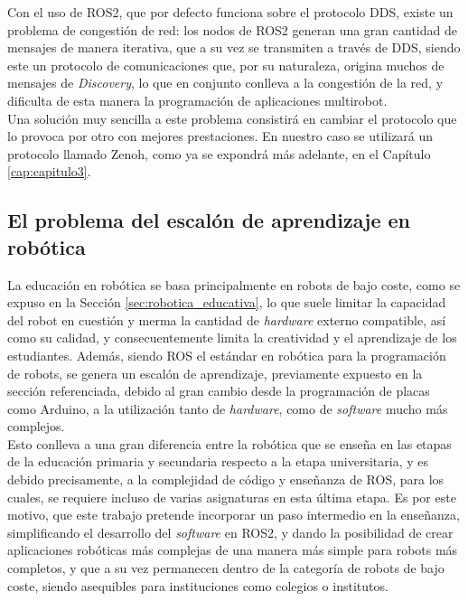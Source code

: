Con el uso de ROS2, que por defecto funciona sobre el protocolo DDS, existe un
problema de congestión de red: los nodos de ROS2 generan una gran cantidad de
mensajes de manera iterativa, que a su vez se transmiten a través de DDS, siendo
este un protocolo de comunicaciones que, por su naturaleza, origina muchos de
mensajes de \textit{Discovery}, lo que en conjunto conlleva a la congestión de
la red, y dificulta de esta manera la programación de aplicaciones multirobot.
\\

Una solución muy sencilla a este problema consistirá en cambiar el protocolo que
lo provoca por otro con mejores prestaciones.
En nuestro caso se utilizará un protocolo llamado Zenoh, como ya se expondrá más
adelante, en el Capítulo \ref{cap:capitulo3}.


\subsection{El problema del escalón de aprendizaje en robótica}
\label{sec:problema_escalon}

La educación en robótica se basa principalmente en robots de bajo coste, como se
expuso en la Sección \ref{sec:robotica_educativa}, lo que suele limitar la
capacidad del robot en cuestión y merma la cantidad de \textit{hardware} externo
compatible, así como su calidad, y consecuentemente limita la creatividad y el
aprendizaje de los estudiantes.
Además, siendo ROS el estándar en robótica para la programación de robots,
se genera un escalón de aprendizaje, previamente expuesto en la sección
referenciada, debido al gran cambio desde la programación de placas como
Arduino, a la utilización tanto de \textit{hardware}, como de \textit{software}
mucho más complejos.
\\

Esto conlleva a una gran diferencia entre la robótica que se enseña en las
etapas de la educación primaria y secundaria respecto a la etapa universitaria,
y es debido precisamente, a la complejidad de código y enseñanza de ROS, para
los cuales, se requiere incluso de varias asignaturas en esta última etapa.
Es por este motivo, que este trabajo pretende incorporar un paso intermedio en
la enseñanza, simplificando el desarrollo del  \textit{software} en ROS2, y
dando la posibilidad de crear aplicaciones robóticas más complejas de una manera
más simple para robots más completos, y que a su vez permanecen dentro de la
categoría de robots de bajo coste, siendo asequibles para instituciones como
colegios o institutos.



